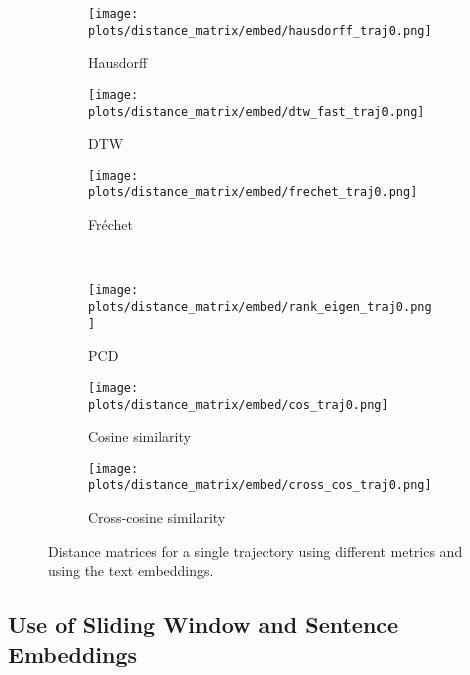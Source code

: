 \documentclass[a4paper,12pt]{article}
\begin{document}
\begin{figure}[H]
    \centering
    \begin{subfigure}[b]{0.32\textwidth}
        \centering
        \texttt{[image: plots/distance\_matrix/embed/hausdorff\_traj0.png]}
        \caption{Hausdorff}
    \end{subfigure}
    \begin{subfigure}[b]{0.32\textwidth}
        \centering
        \texttt{[image: plots/distance\_matrix/embed/dtw\_fast\_traj0.png]}
        \caption{DTW}
    \end{subfigure}
    \begin{subfigure}[b]{0.32\textwidth}
        \centering
        \texttt{[image: plots/distance\_matrix/embed/frechet\_traj0.png]}
        \caption{Fréchet}
    \end{subfigure}
    \\[0.5em]
    \begin{subfigure}[b]{0.32\textwidth}
        \centering
        \texttt{[image: plots/distance\_matrix/embed/rank\_eigen\_traj0.png]}
        \caption{PCD}
    \end{subfigure}
    \begin{subfigure}[b]{0.32\textwidth}
        \centering
        \texttt{[image: plots/distance\_matrix/embed/cos\_traj0.png]}
        \caption{Cosine similarity}
    \end{subfigure}
    \begin{subfigure}[b]{0.32\textwidth}
        \centering
        \texttt{[image: plots/distance\_matrix/embed/cross\_cos\_traj0.png]}
        \caption{Cross-cosine similarity}
    \end{subfigure}
    \caption{Distance matrices for a single trajectory using different metrics and using the text embeddings.}
    \label{fig:distance_metrics_comparison_embed}
\end{figure}



\subsection{Use of Sliding Window and Sentence Embeddings} %
\label{subsec:sliding_window}
\end{document}
